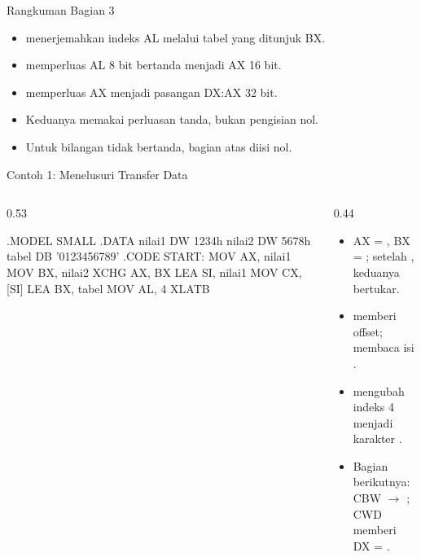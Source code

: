 \documentclass[aspectratio=169,11pt]{beamer}
\begin{document}
\begin{frame}{Rangkuman Bagian 3}
\small
\begin{itemize}
    \item {} menerjemahkan indeks AL melalui tabel yang
          ditunjuk BX.

    \vspace{0.15em}
    \item {} memperluas AL 8 bit bertanda menjadi AX 16 bit.

    \vspace{0.15em}
    \item {} memperluas AX menjadi pasangan DX:AX 32 bit.

    \vspace{0.15em}
    \item Keduanya memakai perluasan tanda, bukan pengisian nol.

    \vspace{0.15em}
    \item Untuk bilangan tidak bertanda, bagian atas diisi nol.
\end{itemize}
\end{frame}

\begin{frame}[fragile]{Contoh 1: Menelusuri Transfer Data}
\begin{columns}[t]
\begin{column}{0.53\textwidth}
\begin{kodeasm}
.MODEL SMALL
.DATA
    nilai1 DW 1234h
    nilai2 DW 5678h
    tabel  DB '0123456789'
.CODE
START:
    MOV AX, nilai1
    MOV BX, nilai2
    XCHG AX, BX
    LEA SI, nilai1
    MOV CX, [SI]
    LEA BX, tabel
    MOV AL, 4
    XLATB
\end{kodeasm}
\end{column}
\begin{column}{0.44\textwidth}
\footnotesize
\begin{itemize}
    \item AX = , BX = ; setelah
          , keduanya bertukar.
    \item {} memberi offset; 
          membaca isi .
    \item {} mengubah indeks 4 menjadi karakter
          .
    \item Bagian berikutnya: CBW  $\rightarrow$
          ; CWD memberi DX = .
\end{itemize}
\end{column}
\end{columns}
\end{frame}
\end{document}
